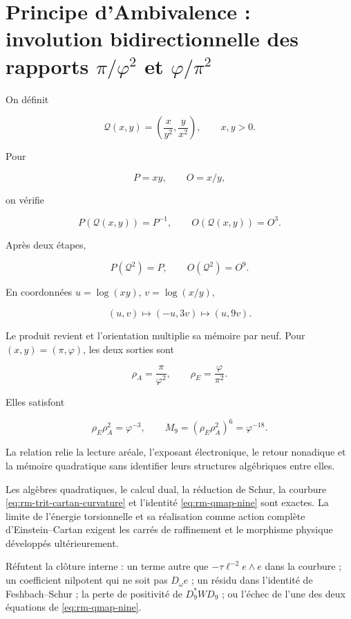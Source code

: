 \section{Principe d'Ambivalence : involution bidirectionnelle des rapports \(\pi/\varphi^2\) et \(\varphi/\pi^2\)}

On définit

\[
\mathcal Q(x,y)=\left(\frac{x}{y^2},\frac{y}{x^2}\right),
\qquad x,y>0.
\]

Pour

\[
P=xy,
\qquad
O=x/y,
\]

on vérifie

\[
P(\mathcal Q(x,y))=P^{-1},
\qquad
O(\mathcal Q(x,y))=O^3.
\]

Après deux étapes,

\begin{equation}
\boxed{P(\mathcal Q^2)=P,
\qquad O(\mathcal Q^2)=O^9.}
\label{eq:rm-qmap-nine}
\end{equation}

En coordonnées \(u=\log(xy)\), \(v=\log(x/y)\),

\[
(u,v)\longmapsto(-u,3v)\longmapsto(u,9v).
\]

Le produit revient et l'orientation multiplie sa mémoire par neuf. Pour
\((x,y)=(\pi,\varphi)\), les deux sorties sont

\[
\rho_A=\frac{\pi}{\varphi^2},
\qquad
\rho_E=\frac{\varphi}{\pi^2}.
\]

Elles satisfont

\[
\rho_E\rho_A^2=\varphi^{-3},
\qquad
M_9=(\rho_E\rho_A^2)^6=\varphi^{-18}.
\]

La relation relie la lecture aréale, l'exposant électronique, le retour nonadique
et la mémoire quadratique sans identifier leurs structures algébriques entre elles.

\begin{proofstatusbox}
Les algèbres quadratiques, le calcul dual, la réduction de Schur, la
courbure \eqref{eq:rm-trit-cartan-curvature} et l'identité
\eqref{eq:rm-qmap-nine} sont exactes. La limite de l'énergie torsionnelle et sa
réalisation comme action complète d'Einstein--Cartan exigent les
carrés de raffinement et le morphisme physique développés ultérieurement.
\end{proofstatusbox}

\begin{falsifierbox}
Réfutent la clôture interne : un terme autre que
\(-\tau\ell^{-2}e\wedge e\) dans la courbure ; un coefficient nilpotent qui ne
soit pas \(D_\omega e\) ; un résidu dans l'identité de Feshbach--Schur ; la perte
de positivité de \(D_9^*WD_9\) ; ou l'échec de l'une des deux équations
de \eqref{eq:rm-qmap-nine}.
\end{falsifierbox}

